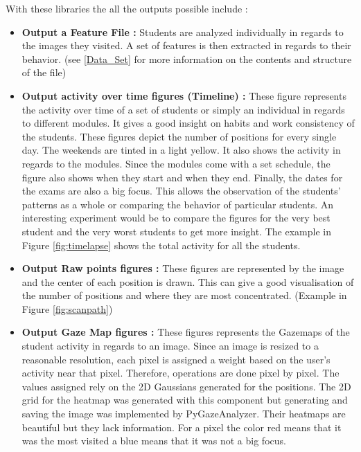 \documentclass[a4paper,11pt]{report}
\numberwithin{figure}{section} %
\begin{document}
    With these libraries the all the outputs possible include :

    \begin{itemize}
        \item[\textbullet] \textbf{Output a Feature File :} Students are analyzed individually in regards to the images they visited.
        A set of features is then extracted in regards to their behavior.
        (see \ref{Data_Set} for more information on the contents and structure of the file)
        \item[\textbullet] \textbf{Output activity over time figures (Timeline) :} These figure represents the activity over time of a set of students or simply an individual in regards to different modules.
        It gives a good insight on habits and work consistency of the students.
        These figures depict the number of positions for every single day.
        The weekends are tinted in a light yellow.
        It also shows the activity in regards to the modules.
        Since the modules come with a set schedule, the figure also shows when they start and when they end.
        Finally, the dates for the exams are also a big focus.
        This allows the observation of the students' patterns as a whole or comparing the behavior of particular students.
        An interesting experiment would be to compare the figures for the very best student and the very worst students to get more insight.
        The example in Figure \ref{fig:timelapse} shows the total activity for all the students.
        \item[\textbullet] \textbf{Output Raw points figures :} These figures are represented by the image and the center of each position is drawn.
        This can give a good visualisation of the number of positions and where they are most concentrated. (Example in Figure \ref{fig:scanpath})
        \item[\textbullet] \textbf{Output Gaze Map figures :} These figures represents the Gazemaps of the student activity in regards to an image.
        Since an image is resized to a reasonable resolution, each pixel is assigned a weight based on the user's activity near that pixel.
        Therefore, operations are done pixel by pixel.
        The values assigned rely on the 2D Gaussians generated for the positions.
        The 2D grid for the heatmap was generated with this component but generating and saving the image was implemented by PyGazeAnalyzer.
        Their heatmaps are beautiful but they lack information. For a pixel the color red means that it was the most visited a blue means that it was not a big focus.

\end{itemize}
\end{document}
